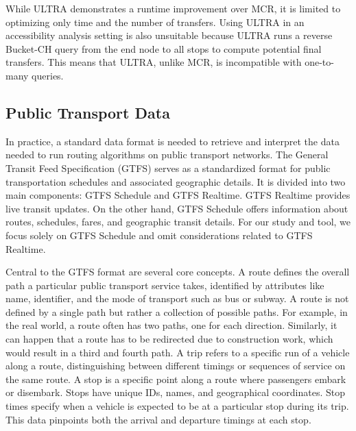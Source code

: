 While ULTRA demonstrates a runtime improvement over MCR, it is limited to optimizing only time and the number of transfers.
Using ULTRA in an accessibility analysis setting is also unsuitable because ULTRA runs a reverse Bucket-CH query from the end node to all stops to compute potential final transfers.
This means that ULTRA, unlike MCR, is incompatible with one-to-many queries.







\subsection{Public Transport Data}
\label{subsec:public_transport_data}

In practice, a standard data format is needed to retrieve and interpret the data needed to run routing algorithms on public transport networks.
The General Transit Feed Specification (GTFS)  serves as a standardized format for public transportation schedules and associated geographic details.
It is divided into two main components: GTFS Schedule and GTFS Realtime.
GTFS Realtime provides live transit updates.
On the other hand, GTFS Schedule offers information about routes, schedules, fares, and geographic transit details.
For our study and tool, we focus solely on GTFS Schedule and omit considerations related to GTFS Realtime.

Central to the GTFS format are several core concepts.
A route defines the overall path a particular public transport service takes, identified by attributes like name, identifier, and the mode of transport such as bus or subway.
A route is not defined by a single path but rather a collection of possible paths.
For example, in the real world, a route often has two paths, one for each direction.
Similarly, it can happen that a route has to be redirected due to construction work, which would result in a third and fourth path.
A trip refers to a specific run of a vehicle along a route, distinguishing between different timings or sequences of service on the same route.
A stop is a specific point along a route where passengers embark or disembark.
Stops have unique IDs, names, and geographical coordinates.
Stop times specify when a vehicle is expected to be at a particular stop during its trip.
This data pinpoints both the arrival and departure timings at each stop.

